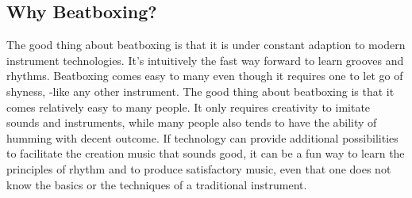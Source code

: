 \subsection{ Why Beatboxing? }
The good thing about beatboxing is that it is under constant adaption to modern instrument technologies. It’s intuitively the fast way forward to learn grooves and rhythms. Beatboxing comes easy to many even though it requires one to let go of shyness, -like any other instrument. The good thing about beatboxing is that it comes relatively easy to many people. It only requires creativity to imitate sounds and instruments, while many people also tends to have the ability of humming with decent outcome. If technology can provide additional possibilities to facilitate the creation music that sounds good, it can be a fun way to learn the principles of rhythm and to produce satisfactory music, even that one does not know the basics or the techniques of a traditional instrument. 